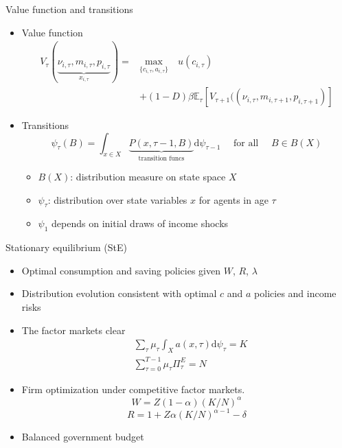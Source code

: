 \documentclass{beamer}
\begin{document}
\begin{frame}{Value function and transitions}
	\begin{itemize}
		\item Value function
		\begin{equation*}
			\begin{split}
				V_{\tau}(\underbrace{\nu_{i,\tau}, m_{i,\tau}, p_{i,\tau}}_{x_{i,\tau}})  =  & \underset{\{c_{i,\tau},a_{i,\tau}\}}{\textrm{max}} \quad   u(c_{i,\tau}) \\
		& +  (1-D)\beta \mathbb{E}_{\tau}\left[V_{\tau+1}((\nu_{i,\tau},m_{i,\tau+1}, p_{i,\tau+1})\right] 
			\end{split}
		\end{equation*}
	
	\item Transitions
		\begin{equation*}
		\label{Eq:DistDyn}
		\psi_{\tau}(B)=\int_{x \in X} \underbrace{P(x, \tau-1, B)}_{\text{transition funcs}}  \mathrm{d}\psi_{\tau-1} \quad \text { for all } \quad B\in B(X)
	\end{equation*}
	\begin{itemize}
	\item $B(X)$:  distribution measure on state space $X$
	\item $\psi_{\tau}$: distribution over state variables $x$ for agents in age $\tau$
	\item $\psi_{1}$ depends on initial draws of income shocks 
\end{itemize}
	
	\end{itemize}

\end{frame}


\begin{frame}{Stationary equilibrium (StE)}
\begin{itemize}
	\item Optimal consumption and saving policies given $W$, $R$, $\lambda$
	\item Distribution evolution consistent with optimal $c$ and $a$ policies and income risks
	\item The factor markets clear 
	\begin{equation*}
	\begin{split}
		& \sum_{\tau} \mu_{\tau} \int_{X}a(x, \tau) \mathrm{d} \psi_{\tau}=K \\
		& \sum^{T-1}_{\tau=0} \mu_{\tau} \Pi^E_\tau= N
	\end{split}
	\end{equation*}
\item Firm optimization under competitive factor markets.
$$W = Z(1-\alpha) (K/N)^\alpha $$
$$R = 1+Z\alpha (K/N)^{\alpha-1} - \delta$$
\item Balanced government budget 
\end{itemize}
\end{frame}
\end{document}
